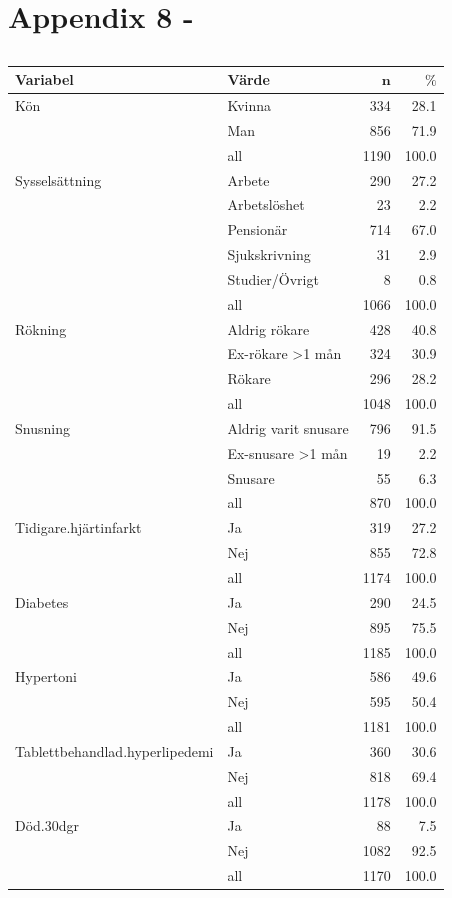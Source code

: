 \newpage
\section{Appendix 8 - }

\begin{table}[ht]
\centering
{\footnotesize
\begin{tabular}{ll|rr}
 \textbf{Variabel} & \textbf{Värde} & $\mathbf{n}$ & $\mathbf{\%}$ \\ 
  \hline
Kön & Kvinna & 334 & 28.1 \\ 
   & Man & 856 & 71.9 \\ 
   \hline
 & all & 1190 & 100.0 \\ 
   \hline
\hline
Sysselsättning & Arbete & 290 & 27.2 \\ 
   & Arbetslöshet & 23 & 2.2 \\ 
   & Pensionär & 714 & 67.0 \\ 
   & Sjukskrivning & 31 & 2.9 \\ 
   & Studier/Övrigt & 8 & 0.8 \\ 
   \hline
 & all & 1066 & 100.0 \\ 
   \hline
\hline
Rökning & Aldrig rökare & 428 & 40.8 \\ 
   & Ex-rökare >1 mån & 324 & 30.9 \\ 
   & Rökare & 296 & 28.2 \\ 
   \hline
 & all & 1048 & 100.0 \\ 
   \hline
\hline
Snusning & Aldrig varit snusare & 796 & 91.5 \\ 
   & Ex-snusare >1 mån & 19 & 2.2 \\ 
   & Snusare & 55 & 6.3 \\ 
   \hline
 & all & 870 & 100.0 \\ 
   \hline
\hline
Tidigare.hjärtinfarkt & Ja & 319 & 27.2 \\ 
   & Nej & 855 & 72.8 \\ 
   \hline
 & all & 1174 & 100.0 \\ 
   \hline
\hline
Diabetes & Ja & 290 & 24.5 \\ 
   & Nej & 895 & 75.5 \\ 
   \hline
 & all & 1185 & 100.0 \\ 
   \hline
\hline
Hypertoni & Ja & 586 & 49.6 \\ 
   & Nej & 595 & 50.4 \\ 
   \hline
 & all & 1181 & 100.0 \\ 
   \hline
\hline
Tablettbehandlad.hyperlipedemi & Ja & 360 & 30.6 \\ 
   & Nej & 818 & 69.4 \\ 
   \hline
 & all & 1178 & 100.0 \\ 
   \hline
\hline
Död.30dgr & Ja & 88 & 7.5 \\ 
   & Nej & 1082 & 92.5 \\ 
   \hline
 & all & 1170 & 100.0 \\ 
   \hline
\hline
\end{tabular}
}
\caption{} 
\label{}
\end{table}

